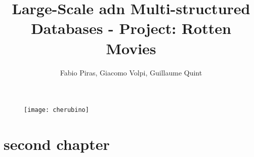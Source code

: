 

\author{Fabio Piras, Giacomo Volpi, Guillaume Quint}
\title{Large-Scale adn Multi-structured Databases - Project: Rotten Movies}
\date{}

\begin{figure}
\centering
\texttt{[image: cherubino]}

\end{figure}

\maketitle


\newpage

\tableofcontents





\chapter{second chapter}
\blindtext



